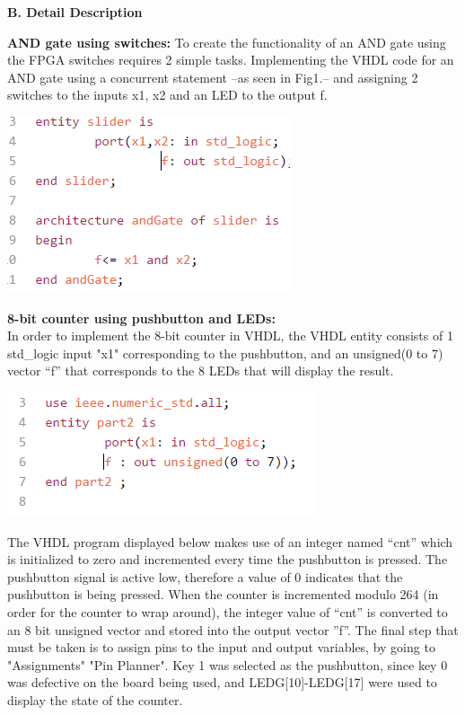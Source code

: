 \documentclass{article}
\newenvironment{Figure}
  {\par\medskip\noindent\ignorespaces\minipage{\linewidth}}
  {\endminipage\par\medskip}
\begin{document}
\begin{multicols*}{2}
{\bf B. Detail Description}

{\bf AND gate using switches:} 
To create the functionality of an AND gate using the FPGA switches requires 2 simple tasks. Implementing the VHDL code for an AND gate using a concurrent statement --as seen in Fig1.-- and assigning 2 switches to the inputs x1, x2 and an LED to the output f.

\begin{Figure}
 \centering
 \includegraphics[height = 4 cm]{slider.png}
\end{Figure}
  

{\bf 8-bit counter using pushbutton and LEDs:} \\
In order to implement the 8-bit counter in VHDL, the VHDL entity consists of 1 std\_logic input "x1" corresponding to the pushbutton, and an unsigned(0 to 7) vector “f” that corresponds to the 8 LEDs that will display the result.


\begin{Figure}
 \centering
 \includegraphics[width=\linewidth]{p2entity.png}
\end{Figure}

The VHDL program displayed below makes use of an integer named “cnt” which is initialized to zero and incremented every time the pushbutton is pressed. The pushbutton signal is active low, therefore a value of 0 indicates that the pushbutton is being pressed. When the counter is incremented modulo 264 (in order for the counter to wrap around), the integer value of “cnt” is converted to an 8 bit unsigned vector and stored into the output vector ”f”. The final step that must be taken is to assign pins to the input and output variables, by going to "Assignments" \textrightarrow "Pin Planner". Key 1 was selected as the pushbutton, since key 0 was defective on the board being used, and LEDG[10]-LEDG[17] were used to display the state of the counter.


\end{multicols*}
\end{document}
